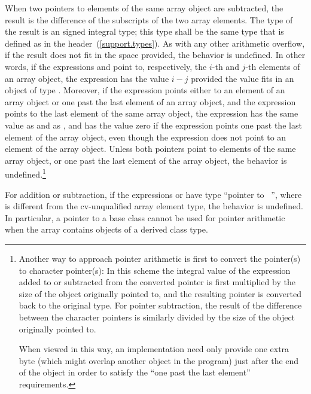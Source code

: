 \pnum
{}%
%
%
%
%
When two pointers to elements of the same array object are subtracted,
the result is the difference of the subscripts of the two array
elements. The type of the result is an  signed
integral type; this type shall be the same type that is defined as
 in the 
header~(\ref{support.types}). As with any other arithmetic overflow, if
the result does not fit in the space provided, the behavior is
undefined. In other words, if the expressions  and 
point to, respectively, the $i$-th and $j$-th elements of an array
object, the expression  has the value $i-j$ provided the
value fits in an object of type . Moreover, if the
expression  points either to an element of an array object or
one past the last element of an array object, and the expression
 points to the last element of the same array object, the
expression  has the same value as 
and as , and has the value zero if the expression
 points one past the last element of the array object, even
though the expression  does not point to an element of the
array object. Unless both pointers point to elements of the same array
object, or one past the last element of the array object, the behavior
is undefined.\footnote{Another way to approach pointer arithmetic is first to convert the
pointer(s) to character pointer(s): In this scheme the integral value of
the expression added to or subtracted from the converted pointer is
first multiplied by the size of the object originally pointed to, and
the resulting pointer is converted back to the original type. For
pointer subtraction, the result of the difference between the character
pointers is similarly divided by the size of the object originally
pointed to.

When viewed in this way, an implementation need only provide one extra
byte (which might overlap another object in the program) just after the
end of the object in order to satisfy the ``one past the last element''
requirements.}

\pnum
For addition or subtraction, if the expressions  or  have
type ``pointer to \cv\ '', where  is different from the
cv-unqualified array element type, the behavior is undefined.
\enternote In particular, a pointer to a base class cannot be used for
pointer arithmetic when the array contains objects of a derived class type.
\exitnote

